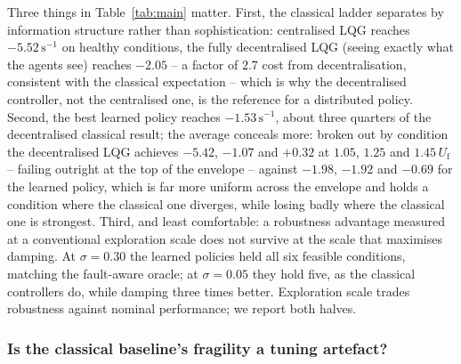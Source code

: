 \documentclass[preprint,11pt]{elsarticle}
\newcommand{\Uf}{U_{\mathrm{f}}}
\begin{document}
Three things in Table~\ref{tab:main} matter. First, the classical ladder
separates by information structure rather than sophistication: centralised
LQG reaches $-5.52\,\mathrm{s}^{-1}$ on healthy conditions, the fully
decentralised LQG (seeing exactly what the agents see) reaches $-2.05$ -- a
factor of $2.7$ cost from decentralisation, consistent with the classical
expectation \cite{siljak1991decentralized,rotkowitz2006characterization}
-- which is why the decentralised controller, not the centralised one, is
the reference for a distributed policy. Second, the best learned policy
reaches $-1.53\,\mathrm{s}^{-1}$, about three quarters of the decentralised
classical result; the average conceals more: broken out by condition the
decentralised LQG achieves $-5.42$, $-1.07$ and $+0.32$ at $1.05$, $1.25$
and $1.45\,\Uf$ -- failing outright at the top of the envelope -- against
$-1.98$, $-1.92$ and $-0.69$ for the learned policy, which is far more
uniform across the envelope and holds a condition where the classical one
diverges, while losing badly where the classical one is strongest. Third,
and least comfortable: a robustness advantage measured at a conventional
exploration scale does not survive at the scale that maximises damping. At
$\sigma=0.30$ the learned policies held all six feasible conditions,
matching the fault-aware oracle; at $\sigma=0.05$ they hold five, as the
classical controllers do, while damping three times better. Exploration
scale trades robustness against nominal performance; we report both
halves.

\subsubsection{Is the classical baseline's fragility a tuning artefact?}
\label{sec:robust-baseline}
\end{document}
